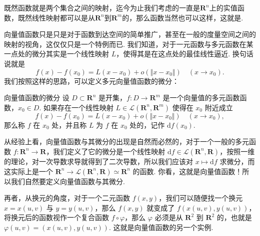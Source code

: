 既然函数就是两个集合之间的映射，迄今为止我们考虑的一直是$\mathbf{R}^n$上的实值函数，既然线性映射都可以是从$\mathbf{R}^n$到$\mathbf{R}^m$的，那么函数当然也可以这样，这就是.

向量值函数只是只是对于函数到达空间的简单推广，甚至在一般的度量空间之间的映射的视角，这仅仅只是一个特例而已. 我们知道，对于一元函数与多元函数在某一点处的微分其实是一个线性映射 $L$，使得其是在这点处的最佳线性逼近. 换句话说就是\[f(x) - f(x_0) = L(x-x_0) + o(\Vert x-x_0\Vert)\quad (x\to x_0).\]我们按照这样的思路，可以定义多元向量值函数的微分：

\begin{definition}{向量值函数的微分}{}
    设 $D\subset\mathbf{R}^n$ 是开集，$f: D\to\mathbf{R}^m$ 是一个向量值的多元函数函数，$x_0\in D$. 如果存在一个线性映射 $L\in \mathcal{L}(\mathbf{R}^n, \mathbf{R}^m)$ 使得在 $x_0$ 附近成立\[f(x) - f(x_0) = L(x-x_0) + o(\Vert x-x_0\Vert)\quad (x\to x_0),\]那么称 $f$ 在 $x_0$ 处，并且称 $L$ 为 $f$ 在 $x_0$ 处的，记作 $\mathrm{d}f(x_0)$.
\end{definition}

从经验上看，向量值函数与其微分的出现是自然而必然的，对于一个一般的多元函数 $f: \mathbf{R}^n\to \mathbf{R}$，我们定义了它的微分是一个线性映射 $\mathrm{d}f\in \mathcal{L}(\mathbf{R}^n, \mathbf{R})$，按照一维的理论，对一次导数求导就得到了二次导数，所以我们应该对 $x \mapsto \mathrm{d}f$ 求微分，而这实际上是一个 $\mathbf{R}^n\to \mathcal{L}(\mathbf{R}^n,\mathbf{R})\simeq \mathbf{R}^n$ 的函数. 你看，这就是向量值函数！所以我们自然要定义向量值函数与其微分.

再者，从换元的角度，对于一个二元函数 $f(x, y)$，我们可以随便找一个换元 $x = x(u, v)$ 与 $y = y(u, v)$，那么 $f(x, y)$ 就变成了 $f(x(u, v), y(u, v))$，将换元后的函数视作一个复合函数 $f\circ \varphi$，那么 $\varphi$ 必须是从 $\mathbf{R}^2$ 到 $\mathbf{R}^2$ 的，也就是 $\varphi(u, v) = (x(u, v), y(u, v))$. 这就是向量值函数的另一个实例.

